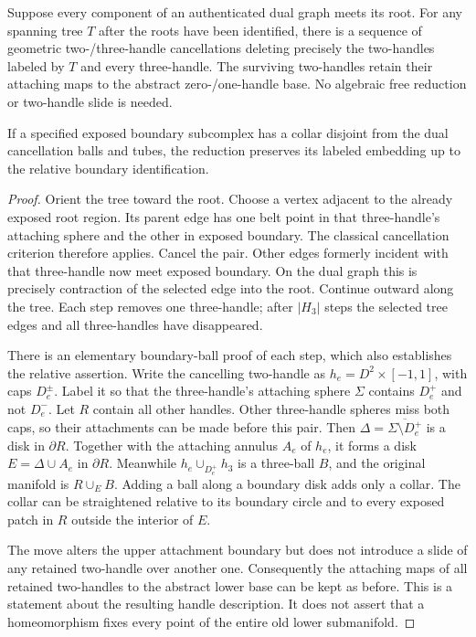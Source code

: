 \begin{lemma}\label{lem:dual-cancel}
Suppose every component of an authenticated dual graph meets its root.
For any spanning tree $T$ after the roots have been identified, there is a
sequence of geometric two-/three-handle cancellations deleting precisely
the two-handles labeled by $T$ and every three-handle.  The surviving
two-handles retain their attaching maps to the abstract zero-/one-handle
base.  No algebraic free reduction or two-handle slide is needed.

If a specified exposed boundary subcomplex has a collar disjoint from the
dual cancellation balls and tubes, the reduction preserves its labeled
embedding up to the relative boundary identification.
\end{lemma}
\begin{proof}
Orient the tree toward the root.  Choose a vertex adjacent to the already
exposed root region.  Its parent edge has one belt point in that
three-handle's attaching sphere and the other in exposed boundary.  The
classical cancellation criterion therefore applies.  Cancel the pair.
Other edges formerly incident with that three-handle now meet exposed
boundary.  On the dual graph this is precisely contraction of the selected
edge into the root.  Continue outward along the tree.  Each step removes one
three-handle; after $|H_3|$ steps the selected tree edges and all three-handles
have disappeared.

There is an elementary boundary-ball proof of each step, which also
establishes the relative assertion.  Write the cancelling two-handle as
$h_e=D^2\times[-1,1]$, with caps $D_e^\pm$.  Label it so that the
three-handle's attaching sphere $\Sigma$ contains $D_e^+$ and not
$D_e^-$.  Let $R$ contain all other handles.  Other three-handle spheres
miss both caps, so their attachments can be made before this pair.  Then
$\Delta=\overline{\Sigma\setminus D_e^+}$ is a disk in $\partial R$.
Together with the attaching annulus $A_e$ of $h_e$, it forms a disk
$E=\Delta\cup A_e$ in $\partial R$.  Meanwhile
$h_e\cup_{D_e^+}h_3$ is a three-ball $B$, and the original manifold is
$R\cup_E B$.  Adding a ball along a boundary disk adds only a collar.
The collar can be straightened relative to its boundary circle and to
every exposed patch in $R$ outside the interior of $E$.

The move alters the upper attachment boundary but does not introduce a
slide of any retained two-handle over another one.  Consequently the
attaching maps of all retained two-handles to the abstract lower base can
be kept as before.  This is a statement about the resulting handle
description.  It does not assert that a homeomorphism fixes every point of
the entire old lower submanifold.
\end{proof}

